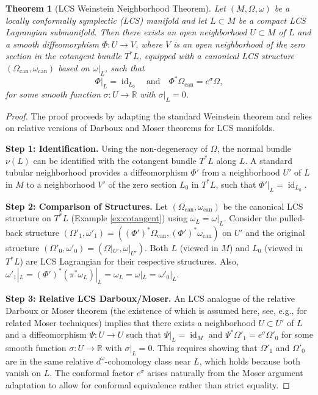 \documentclass[11pt,a4paper]{amsart}
\newtheorem{theorem}{Theorem}[section]
\theoremstyle{definition}
\theoremstyle{remark}
\newcommand{\id}{\operatorname{id}}
\begin{document}
	\begin{theorem}[LCS Weinstein Neighborhood Theorem] \label{thm:weinstein}
		Let $(M, \Omega, \omega)$ be a locally conformally symplectic (LCS) manifold and let $L \subset M$ be a compact LCS Lagrangian submanifold. Then there exists an open neighborhood $U \subset M$ of $L$ and a smooth diffeomorphism $\Phi: U \to V$, where $V$ is an open neighborhood of the zero section in the cotangent bundle $T^*L$, equipped with a canonical LCS structure $(\Omega_{\text{can}}, \omega_{\text{can}})$ based on $\omega|_L$, such that
		\[
		\Phi|_L = \id_{L_0} \quad \text{and} \quad \Phi^*\Omega_{\text{can}} = e^\sigma \Omega,
		\]
		for some smooth function $\sigma : U \to \mathbb{R}$ with $\sigma|_L = 0$.
	\end{theorem}
	
	\begin{proof}
		The proof proceeds by adapting the standard Weinstein theorem \cite{Weinstein1971} and relies on relative versions of Darboux and Moser theorems for LCS manifolds.
		
		\textbf{Step 1: Identification.} Using the non-degeneracy of $\Omega$, the normal bundle $\nu(L)$ can be identified with the cotangent bundle $T^*L$ along $L$. A standard tubular neighborhood provides a diffeomorphism $\Phi'$ from a neighborhood $U'$ of $L$ in $M$ to a neighborhood $V'$ of the zero section $L_0$ in $T^*L$, such that $\Phi'|_L = \id_{L_0}$.
		
		\textbf{Step 2: Comparison of Structures.} Let $(\Omega_{\text{can}}, \omega_{\text{can}})$ be the canonical LCS structure on $T^*L$ (Example \ref{ex:cotangent}) using $\omega_L = \omega|_L$. Consider the pulled-back structure $(\Omega'_1, \omega'_1) = ((\Phi')^*\Omega_{\text{can}}, (\Phi')^*\omega_{\text{can}})$ on $U'$ and the original structure $(\Omega'_0, \omega'_0) = (\Omega|_{U'}, \omega|_{U'})$. Both $L$ (viewed in $M$) and $L_0$ (viewed in $T^*L$) are LCS Lagrangian for their respective structures. Also, $\omega'_1|_L = (\Phi')^*(\pi^*\omega_L)|_L = \omega_L = \omega|_L = \omega'_0|_L$.
		
		\textbf{Step 3: Relative LCS Darboux/Moser.} An LCS analogue of the relative Darboux or Moser theorem (the existence of which is assumed here, see, e.g., \cite{Haller2005} for related Moser techniques) implies that there exists a neighborhood $U \subset U'$ of $L$ and a diffeomorphism $\Psi : U \to U$ such that $\Psi|_L = \id_M$ and $\Psi^*\Omega'_1 = e^\sigma \Omega'_0$ for some smooth function $\sigma : U \to \mathbb{R}$ with $\sigma|_L = 0$. This requires showing that $\Omega'_1$ and $\Omega'_0$ are in the same relative $d^\omega$-cohomology class near $L$, which holds because both vanish on $L$. The conformal factor $e^\sigma$ arises naturally from the Moser argument adaptation to allow for conformal equivalence rather than strict equality.
		

\end{proof}
\end{document}
